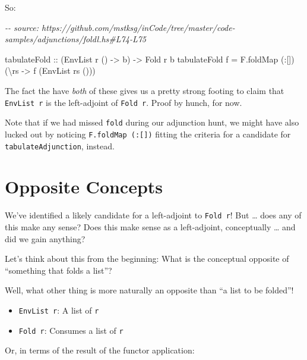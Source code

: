 \documentclass[]{article}
\newenvironment{Shaded}{}{}
\newcommand{\CommentTok}[1]{\textcolor[rgb]{0.38,0.63,0.69}{\textit{#1}}}
\newcommand{\DataTypeTok}[1]{\textcolor[rgb]{0.56,0.13,0.00}{#1}}
\newcommand{\NormalTok}[1]{#1}
\newcommand{\OperatorTok}[1]{\textcolor[rgb]{0.40,0.40,0.40}{#1}}
\newcommand{\OtherTok}[1]{\textcolor[rgb]{0.00,0.44,0.13}{#1}}
\begin{document}
So:

\begin{Shaded}
\begin{Highlighting}[]
\CommentTok{{-}{-} source: https://github.com/mstksg/inCode/tree/master/code{-}samples/adjunctions/foldl.hs\#L74{-}L75}

\OtherTok{tabulateFold ::}\NormalTok{ (}\DataTypeTok{EnvList}\NormalTok{ r () }\OtherTok{{-}>}\NormalTok{ b) }\OtherTok{{-}>} \DataTypeTok{Fold}\NormalTok{ r b}
\NormalTok{tabulateFold f }\OtherTok{=}\NormalTok{ F.foldMap (}\OperatorTok{:}\NormalTok{[]) (\textbackslash{}rs }\OtherTok{{-}>}\NormalTok{ f (}\DataTypeTok{EnvList}\NormalTok{ rs ()))}
\end{Highlighting}
\end{Shaded}

The fact the have \emph{both} of these gives us a pretty strong footing to claim
that \texttt{EnvList\ r} is the left-adjoint of \texttt{Fold\ r}. Proof by
hunch, for now.

Note that if we had missed \texttt{fold} during our adjunction hunt, we might
have also lucked out by noticing \texttt{F.foldMap\ (:{[}{]})} fitting the
criteria for a candidate for \texttt{tabulateAdjunction}, instead.

\hypertarget{opposite-concepts}{%
\section{Opposite Concepts}\label{opposite-concepts}}

We've identified a likely candidate for a left-adjoint to \texttt{Fold\ r}! But
\ldots{} does any of this make any sense? Does this make sense as a
left-adjoint, conceptually \ldots{} and did we gain anything?

Let's think about this from the beginning: What is the conceptual opposite of
``something that folds a list''?

Well, what other thing is more naturally an opposite than ``a list to be
folded''!

\begin{itemize}
\tightlist
\item
  \texttt{EnvList\ r}: A list of \texttt{r}
\item
  \texttt{Fold\ r}: Consumes a list of \texttt{r}
\end{itemize}

Or, in terms of the result of the functor application:
\end{document}
